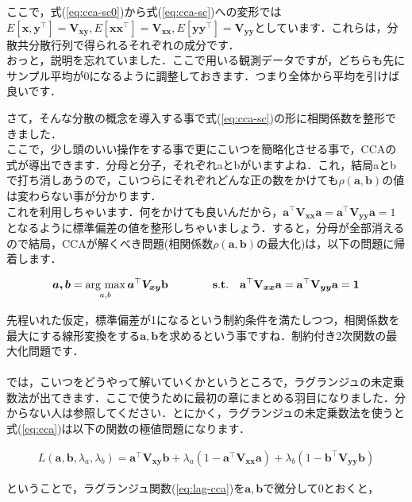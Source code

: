 \documentclass[11pt,a4paper,uplatex]{ujreport}
\newcommand{\argmax}{\mathop{\rm arg~max}\limits}
\begin{document}
ここで，式(\ref{eq:cca-sc0})から式(\ref{eq:cca-sc})への変形では$E[\bm{x,y^\top}] = \bm{V_{xy}}, E[\bm{xx^\top}]=\bm{V_{xx}}, E[\bm{yy^\top}] = \bm{V_{yy}}$としています．これらは，分散共分散行列で得られるそれぞれの成分です．\\

おっと，説明を忘れていました．ここで用いる観測データですが，どちらも先にサンプル平均が0になるように調整しておきます．つまり全体から平均を引けば良いです．

さて，そんな分散の概念を導入する事で式(\ref{eq:cca-sc})の形に相関係数を整形できました．\\

ここで，少し頭のいい操作をする事で更にこいつを簡略化させる事で，CCAの式が導出できます．分母と分子，それぞれaとbがいますよね．これ，結局aとbで打ち消しあうので，こいつらにそれぞれどんな正の数をかけても$\rho(\bm{a,b})$の値は変わらない事が分かります．\\

これを利用しちゃいます．何をかけても良いんだから，$\bm{a}^\top \bm{V_{xx}} \bm{a} = \bm{a}^\top \bm{V_{yy}} \bm{a} = 1$となるように標準偏差の値を整形しちゃいましょう．すると，分母が全部消えるので結局，CCAが解くべき問題(相関係数$\rho(\bm{a,b})$の最大化)は，以下の問題に帰着します．

\begin{align}
  \bm{a,b} = \argmax_{a,b}\bm{a}^\top \bm{V_{xy}} \bf{b} \qquad \qquad s.t. \quad \bm{a}^\top \bm{V_{xx}} \bm{a} = \bm{a}^\top \bm{V_{yy}} \bm{a} = 1
  \label{eq:cca}
\end{align}

先程いれた仮定，標準偏差が1になるという制約条件を満たしつつ，相関係数を最大にする線形変換をする$\bm{a,b}$を求めるという事ですね．制約付き2次関数の最大化問題です．\\
\\

では，こいつをどうやって解いていくかというところで，ラグランジュの未定乗数法が出てきます．ここで使うために最初の章にまとめる羽目になりました．分からない人は参照してください．とにかく，ラグランジュの未定乗数法を使うと式(\ref{eq:cca})は以下の関数の極値問題になります．

\begin{align}
  L(\bm{a,b},\lambda_a, \lambda_b) = \bm{a^\top V_{xy}b} + \lambda_a(1-\bm{a^\top V_{xx}a}) + \lambda_b(1-\bm{b^\top V_{yy} b})
  \label{eq:lag-cca}
\end{align}

ということで，ラグランジュ関数(\ref{eq:lag-cca})を$\bm{a,b}$で微分して0とおくと，
\end{document}
